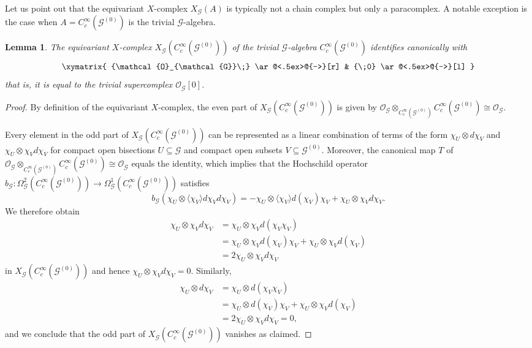 \documentclass{amsart}
\newtheorem{lemma}[thm]{Lemma}
\newcommand{\G}{\mathcal{G}}
\newcommand{\OG}{\mathcal{O}_{\mathcal{G}}}
\newcommand{\ccinfty}{C_c^\infty}
\begin{document}
Let us point out that the equivariant $ X $-complex $ X_\G(A) $ is typically not a chain complex but only a paracomplex. A notable exception is the case when $ A = \ccinfty(\G^{(0)}) $ is the trivial $ \G $-algebra. 

\begin{lemma} \label{XA}
The equivariant $ X $-complex $ X_\G(\ccinfty(\G^{(0)})) $ of the trivial $ \G $-algebra $ \ccinfty(\G^{(0)}) $ identifies canonically with
$$
\xymatrix{
{\OG\;} \ar@<.5ex>@{->}[r]  &
{\;0} 
\ar@<.5ex>@{->}[l]
} 
$$
that is, it is equal to the trivial supercomplex $ \OG[0] $.
\end{lemma}

\begin{proof} 
By definition of the equivariant $ X $-complex, the even part of  $ X_\G(\ccinfty(\G^{(0)})) $ is given by $ \OG \otimes_{\ccinfty(\G^{(0)})} \ccinfty(\G^{(0)}) \cong \OG $. 

Every element in the odd part of $ X_\G(\ccinfty(\G^{(0)})) $ can be represented as a linear combination of terms of the form $ \chi_U \otimes d\chi_V $ and $ \chi_U \otimes \chi_V d\chi_V $ for compact open bisections $ U \subseteq \G $ and compact open subsets $ V \subseteq \G^{(0)} $. Moreover, the canonical map $ T $ of $ \OG \otimes_{\ccinfty(\G^{(0)})} \ccinfty(\G^{(0)}) \cong \OG $ equals the identity, which implies that the Hochschild operator $ b_\G: \Omega^2_\G(\ccinfty(\G^{(0)})) \rightarrow \Omega^1_\G(\ccinfty(\G^{(0)})) $ satisfies
$$
b_\G(\chi_U \otimes \langle \chi_V \rangle d\chi_V d \chi_V) = - \chi_U \otimes \langle \chi_V \rangle d(\chi_V) \chi_V + \chi_U \otimes \chi_V d\chi_V.   
$$
We therefore obtain 
\begin{align*}
\chi_U \otimes \chi_V d\chi_V &= \chi_U \otimes \chi_V d(\chi_V \chi_V) \\
&= \chi_U \otimes \chi_V d(\chi_V) \chi_V + \chi_U \otimes \chi_V d(\chi_V) \\
&= 2 \chi_U \otimes \chi_V d\chi_V
\end{align*}
in $ X_\G(\ccinfty(\G^{(0)})) $ and hence $ \chi_U \otimes \chi_V d\chi_V = 0 $. 
Similarly, 
\begin{align*}
\chi_U \otimes d\chi_V &= \chi_U \otimes d(\chi_V \chi_V) \\
&= \chi_U \otimes d(\chi_V) \chi_V + \chi_U \otimes \chi_V d(\chi_V) \\
&= 2 \chi_U \otimes \chi_V d\chi_V = 0,  
\end{align*}
and we conclude that the odd part of $ X_\G(\ccinfty(\G^{(0)})) $ vanishes as claimed. 
\end{proof}
\end{document}

